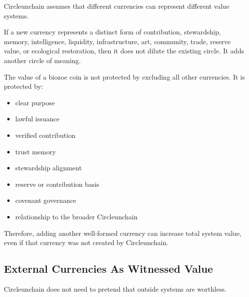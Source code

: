 ﻿\documentclass[12pt]{article}
\begin{document}
Circleunchain assumes that different currencies can represent different value systems.

If a new currency represents a distinct form of contribution, stewardship, memory, intelligence, liquidity, infrastructure, art, community, trade, reserve value, or ecological restoration, then it does not dilute the existing circle. It adds another circle of meaning.

The value of a biozoe coin is not protected by excluding all other currencies. It is protected by:

\begin{itemize}
  \item clear purpose
\end{itemize}
\begin{itemize}
  \item lawful issuance
\end{itemize}
\begin{itemize}
  \item verified contribution
\end{itemize}
\begin{itemize}
  \item trust memory
\end{itemize}
\begin{itemize}
  \item stewardship alignment
\end{itemize}
\begin{itemize}
  \item reserve or contribution basis
\end{itemize}
\begin{itemize}
  \item covenant governance
\end{itemize}
\begin{itemize}
  \item relationship to the broader Circleunchain
\end{itemize}

Therefore, adding another well-formed currency can increase total system value, even if that currency was not created by Circleunchain.

\subsection{External Currencies As Witnessed Value}


Circleunchain does not need to pretend that outside systems are worthless.
\end{document}
